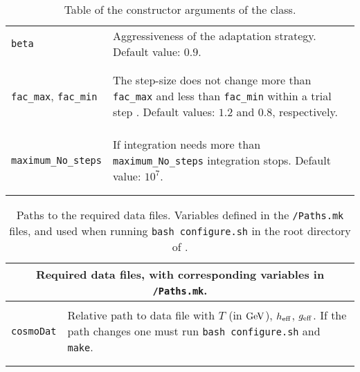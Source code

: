 \documentclass[11pt,a4paper]{article}
\begin{document}
\begin{table}[h!]
\begin{tabular}{l l}
		{\tt beta} & \multirow{1}{12cm}{Aggressiveness of the adaptation strategy.  Default value:  $0.9$.}\\\\
		\hline\\[-0.4cm]

		{\tt fac\_max}, {\tt fac\_min} &\multirow{1}{12cm}{The step-size does not change more than {\tt fac\_max} and less than {\tt fac\_min} within a trial step . Default values: $1.2$ and $0.8$, respectively.} \\ \\ \\ 
		\hline\\[-0.4cm]
		
		{\tt maximum\_No\_steps} & \multirow{1}{12cm}{If integration needs more than {\tt maximum\_No\_steps} integration stops. Default value: $10^7$.}\\\\
		\hline\\[-0.4cm]
	\end{tabular}
	\caption{Table of the constructor arguments of the  class.}
	\label{tab:NSC-input}
\end{table}

		
\begin{table}[h!]
	\centering
	\begin{tabular}{l l}
		\multicolumn{2}{c}{\bf Required data files, with corresponding variables in {\tt \nsc/Paths.mk}.}  \\
		\hline\\[-0.4cm]
	
		{\tt cosmoDat}& \multirow{1}{12cm}{Relative path to data file with $T$ (in ${\rm GeV}$), $h_{\rm eff}{}$, $g_{\rm eff}{}$. If the path changes one must run
		{\tt bash configure.sh} and {\tt make}.}\\\\		
		\hline\\[-0.4cm]

	\end{tabular}
	\caption{Paths to the required data files. Variables defined in the {\tt \nsc/Paths.mk} files, and used when running {\tt bash configure.sh} in the root directory of \nsc.}
\label{tab:input}
\end{table}
\end{document}
